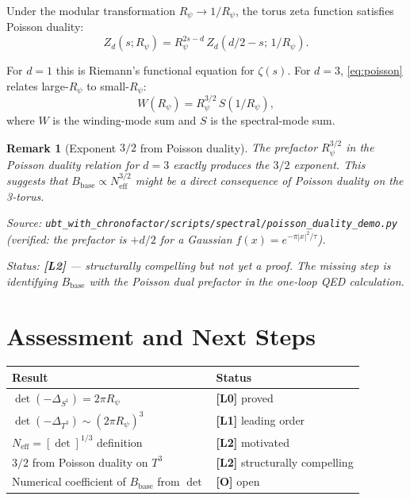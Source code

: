 \documentclass[11pt,a4paper]{article}
\newtheorem{remark}{Remark}
\begin{document}
Under the modular transformation $R_\psi \to 1/R_\psi$, the torus zeta
function satisfies Poisson duality:
\begin{equation}
\label{eq:poisson}
  Z_d(s; R_\psi) = R_\psi^{2s - d}\, Z_d(d/2 - s;\, 1/R_\psi).
\end{equation}

For $d = 1$ this is Riemann's functional equation for $\zeta(s)$.
For $d = 3$, \eqref{eq:poisson} relates large-$R_\psi$ to small-$R_\psi$:
\begin{equation}
  W(R_\psi) = R_\psi^{3/2}\, S(1/R_\psi),
\end{equation}
where $W$ is the winding-mode sum and $S$ is the spectral-mode sum.

\begin{remark}[Exponent $3/2$ from Poisson duality]
  The prefactor $R_\psi^{3/2}$ in the Poisson duality relation for $d=3$
  exactly produces the $3/2$ exponent.  This suggests that
  $B_{\mathrm{base}} \propto N_{\mathrm{eff}}^{3/2}$ might be a direct
  consequence of Poisson duality on the 3-torus.

  Source: \texttt{ubt\_with\_chronofactor/scripts/spectral/poisson\_duality\_demo.py}
  (verified: the prefactor is $+d/2$ for a Gaussian $f(x) = e^{-\pi|x|^2/\tau}$).

  Status: \textbf{[L2]} — structurally compelling but not yet a proof.
  The missing step is identifying $B_{\mathrm{base}}$ with the Poisson dual
  prefactor in the one-loop QED calculation.
\end{remark}

\section{Assessment and Next Steps}
\label{sec:assess}

\begin{center}
\begin{tabular}{ll}
\hline
Result & Status \\
\hline
$\det(-\Delta_{S^1}) = 2\pi R_\psi$ & \textbf{[L0]} proved \\
$\det(-\Delta_{T^3}) \sim (2\pi R_\psi)^3$ & \textbf{[L1]} leading order \\
$N_{\mathrm{eff}} = [\det]^{1/3}$ definition & \textbf{[L2]} motivated \\
$3/2$ from Poisson duality on $T^3$ & \textbf{[L2]} structurally compelling \\
Numerical coefficient of $B_{\mathrm{base}}$ from $\det$ & \textbf{[O]} open \\
\hline
\end{tabular}
\end{center}
\end{document}
